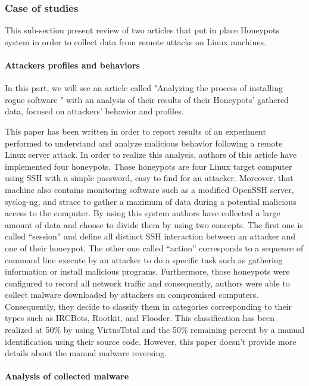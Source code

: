 \subsubsection{Case of studies} %

This sub-section present review of two articles that put in place Honeypots system in order
to collect data from remote attacks on Linux machines. 

\paragraph{Attackers profiles and behaviors} %

In this part, we will see an article called "Analyzing the process of installing
rogue software " with an analysis of their results of their Honeypots’ gathered data,
focused on attackers’ behavior and profiles.

This paper has been written in order to report results of an experiment performed to
understand and analyze malicious behavior following a remote Linux server attack. In order 
to realize this analysis, authors of this article have implemented four honeypots.
Those honeypots are four Linux target computer using SSH with a simple password, easy to 
find for an attacker. Moreover, that machine also contains monitoring software such as a
modified OpenSSH server, syslog-ng, and strace to gather a maximum of data during a 
potential malicious access to the computer.
By using this system authors have collected a large amount of data and choose to divide
them by using two concepts. The first one is called “session” and define all distinct SSH
interaction between an attacker and one of their honeypot. The other one called “action”
corresponds to a sequence of command line execute by an attacker to do a specific task such
as gathering information or install malicious programs. Furthermore, those honeypots were
configured to record all network traffic and consequently, authors were able to collect
malware downloaded by attackers on compromised computers. Consequently, they decide to
classify them in categories corresponding to their types such as IRCBots, Rootkit, and
Flooder. This classification has been realized at 50\% by using VirtusTotal and the 50\%
remaining percent by a manual identification using their source code. However, this paper
doesn’t provide more details about the manual malware reversing.

\paragraph{Analysis of collected malware} %

